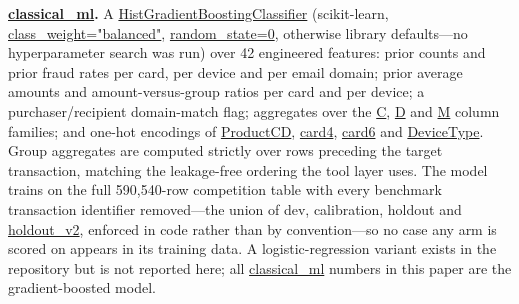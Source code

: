 \documentclass[]{ieeeaccess}
\newcommand{\code}[1]{\url{#1}}
\begin{document}
\textbf{\code{classical_ml}.} A
\code{HistGradientBoostingClassifier} (scikit-learn,
\code{class_weight="balanced"}, \code{random_state=0}, otherwise
library defaults---no hyperparameter search was run) over 42 engineered
features: prior counts and prior fraud rates per card, per device and
per email domain; prior average amounts and amount-versus-group ratios
per card and per device; a purchaser/recipient domain-match flag;
aggregates over the \code{C}, \code{D} and \code{M} column families;
and one-hot encodings of \code{ProductCD}, \code{card4}, \code{card6}
and \code{DeviceType}. Group aggregates are computed strictly over rows
preceding the target transaction, matching the leakage-free ordering
the tool layer uses. The model trains on the full 590{,}540-row
competition table with every benchmark transaction identifier
removed---the union of dev, calibration, holdout and
\code{holdout_v2}, enforced in code rather than by convention---so no
case any arm is scored on appears in its training data. A logistic-regression
variant exists in the repository but is not reported here; all
\code{classical_ml} numbers in this paper are the gradient-boosted
model.
\end{document}
